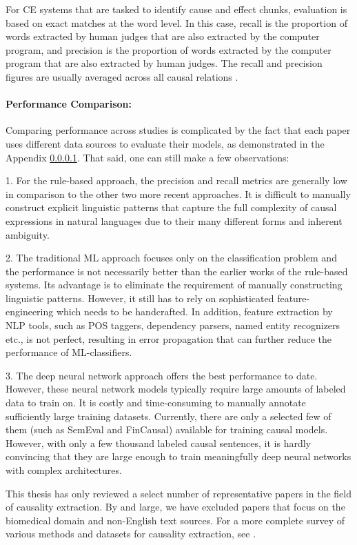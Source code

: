 For CE systems that are tasked to identify cause and effect chunks, evaluation is based on exact matches at the word level. In this case, recall is the proportion of words extracted by human judges that are also extracted by the computer program, and precision is the proportion of words extracted by the computer program that are also extracted by human judges. The recall and precision figures are usually averaged across all causal relations \cite{FinCausal20,Khoo98}.

\paragraph{Performance Comparison:} Comparing performance across studies is complicated by the fact that each paper uses different data sources to evaluate their models, as demonstrated in the Appendix \ref{}. That said, one can still make a few observations:

1. For the rule-based approach, the precision and recall metrics are generally low in comparison to the other two more recent approaches. It is difficult to manually construct explicit linguistic patterns that capture the full complexity of causal expressions in natural languages due to their many different forms and inherent ambiguity.

2. The traditional ML approach focuses only on the classification problem and the performance is not necessarily better than the earlier works of the rule-based systems. Its advantage is to eliminate the requirement of manually constructing linguistic patterns. However, it still has to rely on sophisticated feature-engineering which needs to be handcrafted. In addition, feature extraction by NLP tools, such as POS taggers, dependency parsers, named entity recognizers etc., is not perfect, resulting in error propagation that can further reduce the performance of ML-classifiers. 

3. The deep neural network approach offers the best performance to date. However, these neural network models typically require large amounts of labeled data to train on. It is costly and time-consuming to manually annotate sufficiently large training datasets. Currently, there are only a selected few of them (such as SemEval and FinCausal) available for training causal models. However, with only a few thousand labeled causal sentences, it is hardly convincing that they are large enough to train meaningfully deep neural networks with complex architectures.

This thesis has only reviewed a select number of representative papers in the field of causality extraction. By and large, we have excluded papers that focus on the biomedical domain and non-English text sources. For a more complete survey of various methods and datasets for causality extraction, see \cite{Yang21Survey, Ali21Survey, Xu20Review, Asghar16Survey}. 

